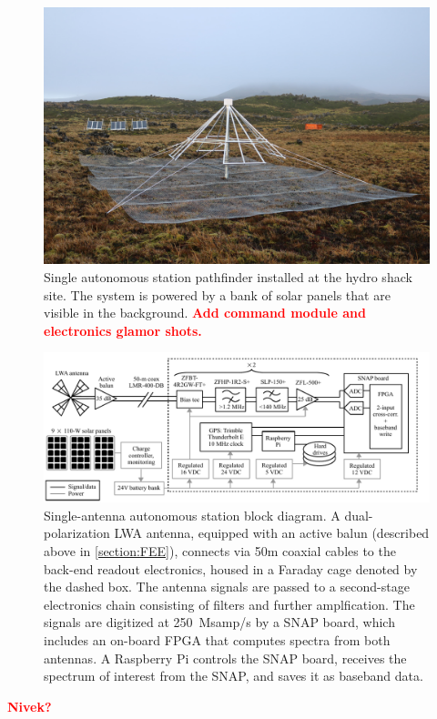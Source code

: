 \documentclass{ws-jai}
\newcommand{\attention}[1]{\textcolor{red}{\bf {#1}}}
\begin{document}
\begin{figure}
  \begin{center}
    \includegraphics[width=0.7\linewidth]{Figures/autonomous.jpg}
    \caption{Single autonomous station pathfinder installed at the
      hydro shack site.  The system is powered by a bank of solar
      panels that are visible in the background.  \attention{
        Add command module and electronics glamor shots.}}
    \label{Fig:autonomous}
  \end{center}
\end{figure}


\begin{figure}
  \begin{center}
    \includegraphics[width=\linewidth]{Figures/albatros_single_schematic/albatros_single_schematic.pdf}
    \caption{Single-antenna autonomous station block diagram. 
      A dual-polarization LWA
      antenna, equipped with an active balun (described above in \ref{section:FEE}), connects via 50m
      coaxial cables to the back-end readout electronics, 
      housed in a Faraday cage denoted by the dashed box. 
      The antenna signals are passed
      to a second-stage electronics chain consisting of filters and further amplfication.  The signals are
      digitized at 250~Msamp/s by a SNAP board, which includes an on-board FPGA that computes spectra from both antennas.  
      A Raspberry Pi controls the SNAP board, receives the spectrum of interest from the SNAP, and saves it as baseband data.}
    \label{Fig:Signal Chain}
  \end{center}
\end{figure}
\attention{Nivek?} \\
\end{document}
